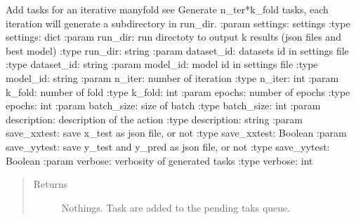 \documentclass[letterpaper,10pt,english]{sphinxmanual}
\begin{document}
\begin{fulllineitems}
\label{\detokenize{pyterk:pyterk.task_manager.add_iterative_manyfold}}
\sphinxAtStartPar
Add tasks for an iterative manyfold \sphinxhyphen{} see 
Generate n\_ter*k\_fold tasks, each iteration will generate a subdirectory in run\_dir.
:param settings: settings
:type settings: dict
:param run\_dir: run directoty to output k results (json files and best model)
:type run\_dir: string
:param dataset\_id: datasets id in settings file
:type dataset\_id: string
:param model\_id: model id in settings file
:type model\_id: string
:param n\_iter: number of iteration
:type n\_iter: int
:param k\_fold: number of fold
:type k\_fold: int
:param epochs: number of epochs
:type epochs: int
:param batch\_size: size of batch
:type batch\_size: int
:param description: description of the action
:type description: string
:param save\_xxtest: save x\_test as json file, or not
:type save\_xxtest: Boolean
:param save\_yytest: save y\_test and y\_pred  as json file, or not
:type save\_yytest: Boolean
:param verbose: verbosity of generated tasks
:type verbose: int
\begin{quote}\begin{description}
\item[{Returns}] \leavevmode
\sphinxAtStartPar
Nothings. Task are added to the pending taks queue.

\end{description}\end{quote}

\end{fulllineitems}
\end{document}
